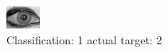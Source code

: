 \begin{figure}[h!]
\begin{center}
\includegraphics[width=0.60\columnwidth]{figures/ID2018_class_1_target_2.png}
\end{center}
\caption{ Classification: 1 actual target: 2}
\label{fig:ID2018_class_1_target_2}
\end{figure}
